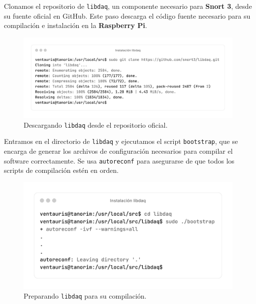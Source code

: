 \documentclass[12pt,a4paper]{report}
\begin{document}
\newpage

Clonamos el repositorio de \texttt{libdaq}, un componente necesario para \textbf{Snort 3}, desde su fuente oficial en GitHub. Este paso descarga el código fuente necesario para su compilación e instalación en la \textbf{Raspberry Pi}.

\begin{figure}[H]
	\centering
	\includegraphics[scale=0.12]{instalacion_snort/9-9.png}
	\caption{Descargando \texttt{libdaq} desde el repositorio oficial.}
\end{figure}

Entramos en el directorio de \texttt{libdaq} y ejecutamos el script \texttt{bootstrap}, que se encarga de generar los archivos de configuración necesarios para compilar el software correctamente. Se usa \texttt{autoreconf} para asegurarse de que todos los scripts de compilación estén en orden.

\begin{figure}[H]
	\centering
	\includegraphics[scale=0.12]{instalacion_snort/10-10.png}
	\caption{Preparando \texttt{libdaq} para su compilación.}
\end{figure}

\newpage

\end{document}
